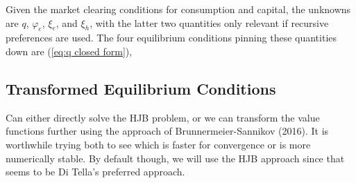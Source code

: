 \documentclass[12 pt, oneside]{article}
\theoremstyle{definition}
\theoremstyle{definition}
\theoremstyle{definition}
\begin{document}
Given the market clearing conditions for consumption and capital, the unknowns are $q$, $\varphi_e$, $\xi_e$, and $\xi_h$, with the latter two quantities only relevant if recursive preferences are used. The four equilibrium conditions pinning these quantities down are (\ref{eq:q closed form}),


\subsection{Transformed Equilibrium Conditions}
Can either directly solve the HJB problem, or we can transform the value functions further using the approach of Brunnermeier-Sannikov (2016). It is worthwhile trying both to see which is faster for convergence or is more numerically stable. By default though, we will use the HJB approach since that seems to be Di Tella's preferred approach.
\end{document}
